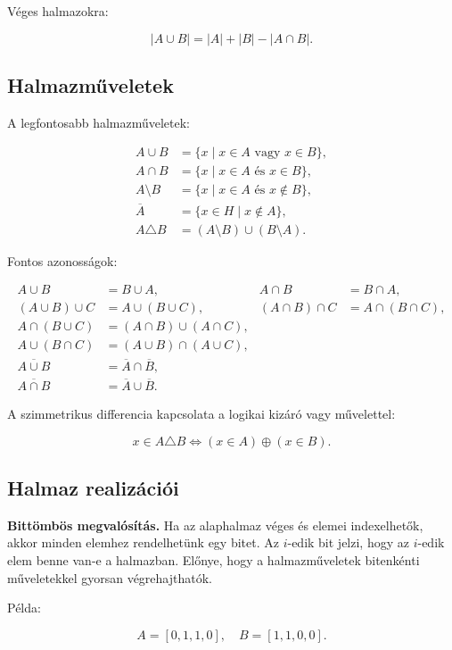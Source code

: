 Véges halmazokra:

\[
|A\cup B|=|A|+|B|-|A\cap B|.
\]

\subsection{Halmazműveletek}

A legfontosabb halmazműveletek:

\begin{align*}
A\cup B &= \{x\mid x\in A \text{ vagy } x\in B\},\\
A\cap B &= \{x\mid x\in A \text{ és } x\in B\},\\
A\setminus B &= \{x\mid x\in A \text{ és } x\notin B\},\\
\overline{A} &= \{x\in H\mid x\notin A\},\\
A\triangle B &= (A\setminus B)\cup(B\setminus A).
\end{align*}

Fontos azonosságok:

\begin{align*}
A\cup B &= B\cup A, & A\cap B &= B\cap A,\\
(A\cup B)\cup C &= A\cup(B\cup C), & (A\cap B)\cap C &= A\cap(B\cap C),\\
A\cap(B\cup C) &= (A\cap B)\cup(A\cap C),\\
A\cup(B\cap C) &= (A\cup B)\cap(A\cup C),\\
\overline{A\cup B} &= \overline{A}\cap\overline{B},\\
\overline{A\cap B} &= \overline{A}\cup\overline{B}.
\end{align*}

A szimmetrikus differencia kapcsolata a logikai kizáró vagy művelettel:

\[
x\in A\triangle B \Longleftrightarrow (x\in A)\oplus(x\in B).
\]

\subsection{Halmaz realizációi}

\textbf{Bittömbös megvalósítás.} Ha az alaphalmaz véges és elemei indexelhetők, akkor minden elemhez rendelhetünk egy bitet. Az $i$-edik bit jelzi, hogy az $i$-edik elem benne van-e a halmazban. Előnye, hogy a halmazműveletek bitenkénti műveletekkel gyorsan végrehajthatók.

Példa:

\[
A=[0,1,1,0],\quad B=[1,1,0,0].
\]


